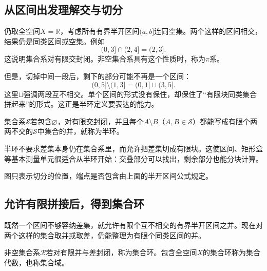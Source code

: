 \subsection{从区间出发理解交与切分}

仍取全空间$X=\mathbb R$，考虑所有有界半开区间$(a,b]$连同空集。两个这样的区间相交，结果仍是同类区间或空集。例如
\[
 (0,3]\cap(2,4]=(2,3].
\]
这说明集合系对有限交封闭。非空集合系具有这个性质时，称为$\pi$系。

但是，切掉中间一段后，剩下的部分可能不再是一个区间：
\[
 (0,5]\setminus(1,3]=(0,1]\sqcup(3,5].
\]
这里$\sqcup$强调两段互不相交。单个区间的形式没有保住，却保住了“有限块同类集合拼起来”的形式。这正是半环定义要表达的能力。

\begin{definition}[半环]
集合系$\mathcal S$若包含$\varnothing$，对有限交封闭，并且每个$A\setminus B$（$A,B\in\mathcal S$）都能写成有限个两两不交的$\mathcal S$中集合的并，就称为半环。
\end{definition}

半环不要求差集本身仍在集合系里，而允许把差集切成有限块。这使区间、矩形盒等基本测量单元很适合从半环开始：交叠部分可以找出，剩余部分也能分块计算。

\begin{center}
\end{center}
图只表示切分的位置，端点是否包含由上面的半开区间公式规定。

\subsection{允许有限拼接后，得到集合环}

既然一个区间不够容纳差集，就允许有限个互不相交的有界半开区间之并。现在对两个这样的集合取并或取差，仍能整理为有限个同类区间的并。

\begin{definition}[集合环与集合代数]
非空集合系$\mathcal R$若对有限并与差封闭，称为集合环。包含全空间$X$的集合环称为集合代数，也称集合域。
\end{definition}

